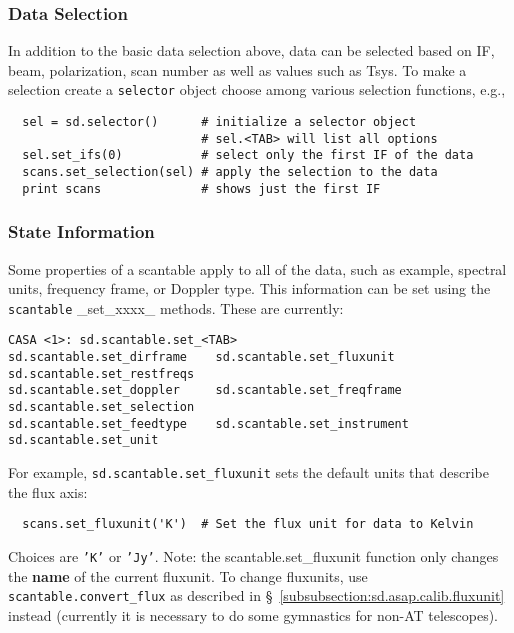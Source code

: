 \subsubsection{Data Selection}
\label{subsubsection:sd.asap.scantable.select}

In addition to the basic data selection above, data can be selected
based on IF, beam, polarization, scan number as well as values such as
Tsys.  To make a selection create a {\tt selector} object choose among various
selection functions, e.g., 

\small
\begin{verbatim}
  sel = sd.selector()      # initialize a selector object
                           # sel.<TAB> will list all options
  sel.set_ifs(0)           # select only the first IF of the data
  scans.set_selection(sel) # apply the selection to the data
  print scans              # shows just the first IF
\end{verbatim}
\normalsize

\subsubsection{State Information}
\label{subsubsection:sd.asap.scantable.state}

Some properties of a scantable apply to all of the data, such as
example, spectral units, frequency frame, or Doppler type. This
information can be set using the {\tt scantable} \_set\_xxxx\_
methods.  These are currently:
\small
\begin{verbatim}
CASA <1>: sd.scantable.set_<TAB>
sd.scantable.set_dirframe    sd.scantable.set_fluxunit    sd.scantable.set_restfreqs   
sd.scantable.set_doppler     sd.scantable.set_freqframe   sd.scantable.set_selection   
sd.scantable.set_feedtype    sd.scantable.set_instrument  sd.scantable.set_unit
\end{verbatim}
\normalsize

For example, {\tt sd.scantable.set\_fluxunit} sets the default units
that describe the flux axis:
\small
\begin{verbatim}
  scans.set_fluxunit('K')  # Set the flux unit for data to Kelvin
\end{verbatim}
\normalsize
Choices are {\tt 'K'} or {\tt 'Jy'}.
Note: the scantable.set\_fluxunit function only changes the {\bf name}
of the current fluxunit. To change fluxunits, use 
{\tt scantable.convert\_flux} as described in 
\S~\ref{subsubsection:sd.asap.calib.fluxunit}
instead (currently it is necessary to do some gymnastics for non-AT
telescopes).

